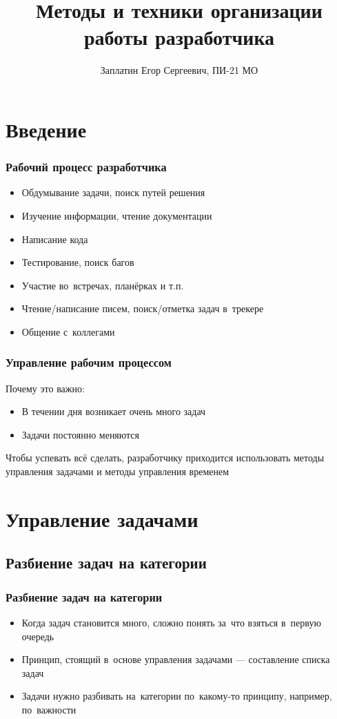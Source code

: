 \documentclass{../industrial-development}
\title{Методы и техники организации работы разработчика}
\author{Заплатин Егор Сергеевич, ПИ-21 МО}
\date{}
\begin{document}
\begin{frame}
  \titlepage
\end{frame}

\section{Введение}

\begin{frame} \frametitle{Рабочий процесс разработчика}
  \begin{itemize}
  \item Обдумывание задачи, поиск путей решения
  \item Изучение информации, чтение документации
  \item Написание кода
  \item Тестирование, поиск багов
  \item Участие во~встречах, планёрках и т.п.
  \item Чтение/написание писем, поиск/отметка задач в~трекере
  \item Общение с~коллегами
  \end{itemize}
\end{frame}

\begin{frame} \frametitle{Управление рабочим процессом}
Почему это важно:
  \begin{itemize}
  \item В течении дня возникает очень много задач
  \item Задачи постоянно меняются
  \end{itemize}
  \begin{block}{}
    Чтобы успевать всё сделать, разработчику приходится использовать методы управления задачами и методы управления временем
  \end{block}
\end{frame}

\section{Управление задачами}

\subsection{Разбиение задач на категории}

\begin{frame} \frametitle{Разбиение задач на категории}

  \begin{itemize}
  \item Когда задач становится много, сложно понять за~что взяться в~первую очередь
  \item Принцип, стоящий в~основе управления задачами --- составление списка задач
  \item Задачи нужно разбивать на~категории по~какому-то принципу, например, по~важности
  \end{itemize}
\end{frame}
\end{document}
